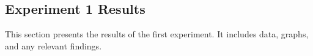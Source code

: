 \subsection{Experiment 1 Results}

This section presents the results of the first experiment. It includes data, graphs, and any relevant findings.